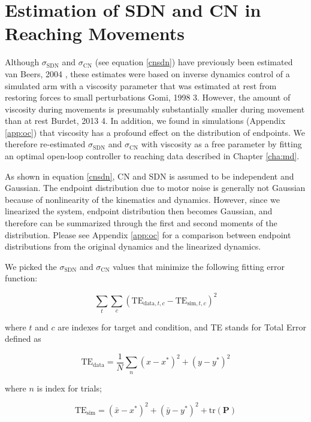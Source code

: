 \section{Estimation of SDN and CN in Reaching Movements}
Although $\sigma_{\text{SDN}}$ and $\sigma_{\text{CN}}$ (see equation \ref{cnsdn}) have previously been estimated {van Beers, 2004 }, these estimates were based on inverse dynamics control of a simulated arm with a viscosity parameter that was estimated at rest from restoring forces to small perturbations {Gomi, 1998 3}. 
However, the amount of viscosity during movements is presumably substantially smaller during movement than at rest {Burdet, 2013 4}. 
In addition, we found in simulations (Appendix \ref{app:oc}) that viscosity has a profound effect on the distribution of endpoints.  
We therefore re-estimated $\sigma_{\text{SDN}}$ and $\sigma_{\text{CN}}$ with viscosity as a free parameter by fitting an optimal open-loop controller to reaching data described in Chapter \ref{cha:md}.

As shown in equation \ref{cnsdn}, CN and SDN is assumed to be independent and Gaussian. 
The endpoint distribution due to motor noise is generally not Gaussian because of nonlinearity of the kinematics and dynamics.
However, since we linearized the system, endpoint distribution then becomes Gaussian, and therefore can be summarized through the first and second moments of the distribution. 
Please see Appendix \ref{app:oc} for a comparison between endpoint distributions from the original dynamics and the linearized dynamics.

We picked the $\sigma_{\text{SDN}}$ and $\sigma_{\text{CN}}$ values that minimize the following fitting error function:

\begin{equation}
\sum_{t}\sum_{c} (\text{TE}_{\text{data},t,c} - \text{TE}_{\text{sim},t,c})^2
\end{equation}

where $t$ and $c$ are indexes for target and condition, and TE stands for Total Error defined as 

\begin{equation}
\text{TE}_{\text{data}} = \frac1N\sum_n(x - x^*)^2 + (y - y^*)^2
\end{equation}

where $n$ is index for trials;

\begin{equation}
\text{TE}_{\text{sim}} = (\bar{x} - x^*)^2 + (\bar{y} - y^*)^2 + \text{tr}(\bm{P})
\end{equation}

